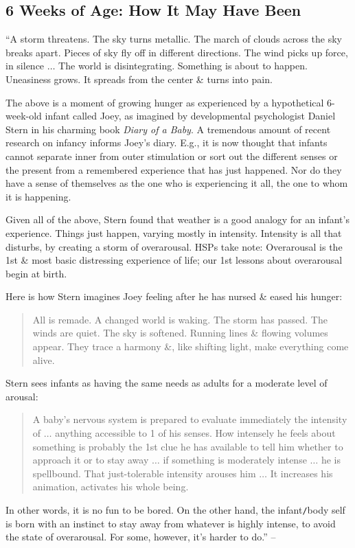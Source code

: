 \documentclass{article}
\numberwithin{equation}{section}
\begin{document}
\subsection{6 Weeks of Age: How It May Have Been}
``A storm threatens. The sky turns metallic. The march of clouds across the sky breaks apart. Pieces of sky fly off in different directions. The wind picks up force, in silence $\ldots$ The world is disintegrating. Something is about to happen. Uneasiness grows. It spreads from the center \& turns into pain.

The above is a moment of growing hunger as experienced by a hypothetical 6-week-old infant called Joey, as imagined by developmental psychologist Daniel Stern in his charming book \textit{Diary of a Baby}. A tremendous amount of recent research on infancy informs Joey's diary. E.g., it is now thought that infants cannot separate inner from outer stimulation or sort out the different senses or the present from a remembered experience that has just happened. Nor do they have a sense of themselves as the one who is experiencing it all, the one to whom it is happening.

Given all of the above, Stern found that weather is a good analogy for an infant's experience. Things just happen, varying mostly in intensity. Intensity is all that disturbs, by creating a storm of overarousal. HSPs take note: Overarousal is the 1st \& most basic distressing experience of life; our 1st lessons about overarousal begin at birth.

Here is how Stern imagines Joey feeling after he has nursed \& eased his hunger:
\begin{quotation}
	All is remade. A changed world is waking. The storm has passed. The winds are quiet. The sky is softened. Running lines \& flowing volumes appear. They trace a harmony \&, like shifting light, make everything come alive.
\end{quotation}
Stern sees infants as having the same needs as adults for a moderate level of arousal:
\begin{quotation}
	A baby's nervous system is prepared to evaluate immediately the intensity of $\ldots$ anything accessible to 1 of his senses. How intensely he feels about something is probably the 1st clue he has available to tell him whether to approach it or to stay away $\ldots$ if something is moderately intense $\ldots$ he is spellbound. That just-tolerable intensity arouses him $\ldots$ It increases his animation, activates his whole being.
\end{quotation}
In other words, it is no fun to be bored. On the other hand, the infant{\tt/}body self is born with an instinct to stay away from whatever is highly intense, to avoid the state of overarousal. For some, however, it's harder to do.'' -- \cite[pp. 74--75]{Aron2013}
\end{document}
